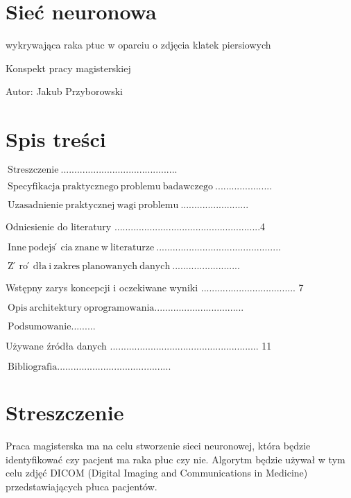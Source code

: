 \documentclass[10pt]{article}
\begin{document}
\section{Sieć neuronowa}
wykrywająca raka ptuc w oparciu o zdjęcia klatek piersiowych

Konspekt pracy magisterskiej

Autor: Jakub Przyborowski

\section{Spis treści}
$\mathrm{~ S t r e s z c z e n i e ~ . . . . . . . . . . . . . . . . . . . . . . . . . . . . . . . . . . . . . . . . . . .}$

$\mathrm{~ S p e c y f i k a c j a ~ p r a k t y c z n e g o ~ p r o b l e m u ~ b a d a w c z e g o ~ . . . . . . . . . . . . . . . . . . . . .}$

$\mathrm{~ U z a s a d n i e n i e ~ p r a k t y c z n e j ~ w a g i ~ p r o b l e m u ~ . . . . . . . . . . . . . . . . . . . . . . . . .}$

Odniesienie do literatury ......................................................4

$\mathrm{~ I n n e ~ p o d e j s ́ c i a ~ z n a n e ~ w ~ l i t e r a t u r z e ~ . . . . . . . . . . . . . . . . . . . . . . . . . . . . . . . . . . . . . . . . . . . . . .}$

$\mathrm{~ Z ́ r o ́ d ł a ~ i ~ z a k r e s ~ p l a n o w a n y c h ~ d a n y c h ~ . . . . . . . . . . . . . . . . . . . . . . . . .}$

Wstępny zarys koncepcji i oczekiwane wyniki ................................... 7

$\mathrm{~ O p i s ~ a r c h i t e k t u r y ~ o p r o g r a m o w a n i a . . . . . . . . . . . . . . . . . . . . . . . . . . . . . . . . .}$

$\mathrm{~ P o d s u m o w a n i e . . . . . . . . .}$

Używane źródła danych ....................................................... 11

$\mathrm{~ B i b l i o g r a f i a . . . . . . . . . . . . . . . . . . . . . . . . . . . . . . . . . . . . . . . . . .}$

\section{Streszczenie}
Praca magisterska ma na celu stworzenie sieci neuronowej, która będzie identyfikować czy pacjent ma raka płuc czy nie. Algorytm będzie używał w tym celu zdjęć DICOM (Digital Imaging and Communications in Medicine) przedstawiających płuca pacjentów.
\end{document}
